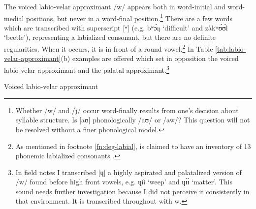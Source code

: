 The voiced labio-velar approximant /{w}/ appears both in word-initial and 
word-medial positions, but never in a word-final position.\footnote{Whether 
/{w}/ and /{j}/ occur word-finally results from one’s decision about 
syllable structure. Is [{aʊ}] phonologically /{aʊ}/ or /{aw}/? 
This question will not be resolved without a finer phonological model.}  There are a few words which are transcribed with superscript [ʷ] (e.g. {\sls  bʷɔ́ŋ} `difficult' and {\sls  zàkʷʊ́ʊ́l} `beetle'),  representing a labialized consonant, but there are  no definite regularities. When it  occurs, it is in front of a round vowel.\footnote{As mentioned in 
footnote \ref{fn:deg-labial},  is claimed to have an inventory of 13 phonemic labialized consonants \citep[2]{Crou03}. } In Table \ref{tab:labio-velar-approximant}(b)  examples are offered which set in opposition the voiced labio-velar approximant and the palatal 
approximant.\footnote{In field notes I transcribed [{ɥ}]  a highly 
aspirated and palatalized version of /{w}/ found before high front 
vowels, e.g. {\sls ɥìì} `weep' and {\sls ɥɪ́ɪ́}  `matter'. This sound needs  further 
investigation because I did not perceive it consistently in that environment. It is transcribed throughout with {\sls w}.}


 
\begin{table}


\caption{Voiced labio-velar approximant\label{tab:labio-velar-approximant}}

\quad
{}


\end{table}

